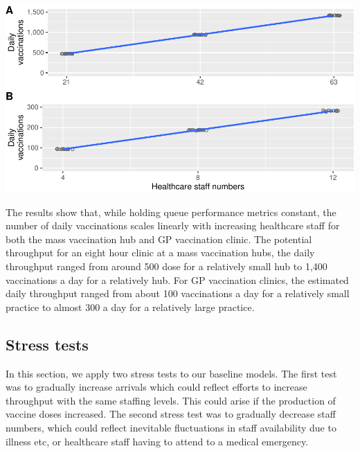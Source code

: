 \documentclass{article}
\let\origfigure\figure
\let\endorigfigure\endfigure
\renewenvironment{figure}[1][2] {
    \expandafter\origfigure\expandafter[H]
} {
    \endorigfigure
}
\begin{document}
\begin{figure}

{\centering \includegraphics{Preprint_files/figure-latex/baselineThroughput-1} 

}

\caption{Baseline processing time for mass vaccination hubs (A) and GP vaccination clinics (B)}\label{fig:baselineThroughput}
\end{figure}

The results show that, while holding queue performance metrics constant,
the number of daily vaccinations scales linearly with increasing
healthcare staff for both the mass vaccination hub and GP vaccination
clinic. The potential throughput for an eight hour clinic at a mass
vaccination hubs, the daily throughput ranged from around 500 dose for a
relatively small hub to 1,400 vaccinations a day for a relatively hub.
For GP vaccination clinics, the estimated daily throughput ranged from
about 100 vaccinations a day for a relatively small practice to almost
300 a day for a relatively large practice.

\hypertarget{stress-tests}{%
\subsection{Stress tests}\label{stress-tests}}

In this section, we apply two stress tests to our baseline models. The
first test was to gradually increase arrivals which could reflect
efforts to increase throughput with the same staffing levels. This could
arise if the production of vaccine doses increased. The second stress
test was to gradually decrease staff numbers, which could reflect
inevitable fluctuations in staff availability due to illness etc, or
healthcare staff having to attend to a medical emergency.
\end{document}
